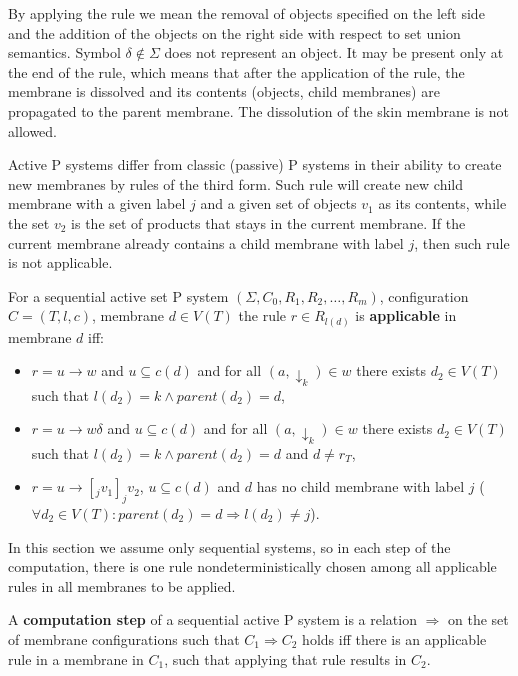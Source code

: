   By applying the rule we mean the removal of objects specified on the left side and the addition of the objects on the right side with respect to set union semantics.
  Symbol $\delta\notin\Sigma$ does not represent an object. It may be present only at the end of the rule, which means that after the application of the rule, the membrane is dissolved and its contents (objects, child membranes) are propagated to the parent membrane. The dissolution of the skin membrane is not allowed. 

  Active P systems differ from classic (passive) P systems in their ability to create new membranes by rules of the third form. Such rule will create new child membrane with a given label $j$ and a given set of objects $v_1$ as its contents, while the set $v_2$ is the set of products that stays in the current membrane. If the current membrane already contains a child membrane with label $j$, then such rule is not applicable.


  \begin{definition}
  \label{def:rule_is_applicable_in_sequential_active_p_system}
    For a sequential active set P system $(\Sigma, C_0, R_1, R_2, \dots , R_m)$, configuration $C = (T, l, c)$, membrane $d\in V(T)$ the rule $r\in R_{l(d)}$ is {\bf applicable} in membrane $d$ iff:
    \begin{itemize}
      \item $r = u\rightarrow w$ and $u\subseteq c(d)$ and for all $(a,\downarrow_k)\in w$ there exists $d_2\in V(T)$ such that $l(d_2)=k \wedge parent(d_2) = d$,
      \item $r = u\rightarrow w\delta$ and $u\subseteq c(d)$ and for all $(a,\downarrow_k)\in w$ there exists $d_2\in V(T)$ such that $l(d_2)=k \wedge parent(d_2) = d$ and $d\neq r_T$,
      \item $r = u\rightarrow [_j v_1]_j v_2$, $u\subseteq c(d)$ and $d$ has no child membrane with label $j$ ($\forall d_2\in V(T):  parent(d_2)=d \Rightarrow l(d_2)\neq j$).
    \end{itemize}
  \end{definition}

  In this section we assume only sequential systems, so in each step of the computation, there is one rule nondeterministically chosen among all applicable rules in all membranes to be applied.


  A {\bf computation step} of a sequential active P system is a relation $\Rightarrow$ on the set of membrane configurations such that $C_1 \Rightarrow C_2$ holds iff there is an applicable rule in a membrane in $C_1$, such that applying that rule results in $C_2$.


